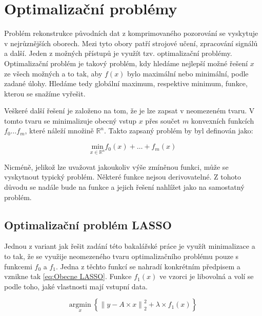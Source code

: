 \documentclass[FM,BP]{tulthesis}
\newcounter{Vzorce}
\begin{document}
\chapter{Optimalizační problémy}
\label{ch:optproblem}
Problém rekonstrukce původních dat z komprimovaného pozorování se vyskytuje v nejrůznějších oborech.  Mezi tyto obory patří strojové učení, zpracování signálů a další. Jeden z možných přístupů je využít tzv. optimalizační problémy. Optimalizační problém je takový problém, kdy hledáme nejlepší možné řešení $x$ ze všech možných a to tak, aby $f(x)$ bylo maximální nebo minimální, podle zadané úlohy. Hledáme tedy globální maximum, respektive minimum, funkce, kterou se snažíme vyřešit. 


Veškeré další řešení je založeno na tom, že je lze zapsat v neomezeném tvaru. V tomto tvaru se minimalizuje obecný vstup $x$ přes součet $m$ konvexních funkcích $f_0 \ldots f_m$, které náleží množině $\mathbb{R}^n$. Takto zapsaný problém by byl definován jako:

\begin{equation} \label{eq:Obecny problem} \tag{Vzorec \theVzorce}
\underset{x \in \mathbb{R}^n} {\mathrm{min}} f_{0}(x)+\ldots+f_{m}(x)
\end{equation}

Nicméně, jelikož lze uvažovat jakoukoliv výše zmíněnou funkci, může se vyskytnout typický problém. Některé funkce nejsou derivovatelné. Z tohoto důvodu se nadále bude na funkce a jejich řešení nahlížet jako na samostatný problém.

\section{Optimalizační problém LASSO}
Jednou z variant jak řešit zadání této bakalářské práce je využít minimalizace a to tak, že se využije neomezeného tvaru optimalizačního problému pouze s funkcemi $f_0$ a $f_1$. Jedna z těchto funkcí se nahradí konkrétním předpisem a vznikne tak \ref{eq:Obecne LASSO}. Funkce $f_1(x)$ ve vzorci je libovolná a volí se podle toho, jaké vlastnosti mají vstupní data. 

\begin{equation} \label{eq:Obecne LASSO} \tag{Vzorec \theVzorce}
\underset{x} {\mathrm{argmin}} ~\left\{\left\|y-A \times x\right\| ^2 _2+ \lambda \times f_1(x)\right\}
\end{equation}
\end{document}
